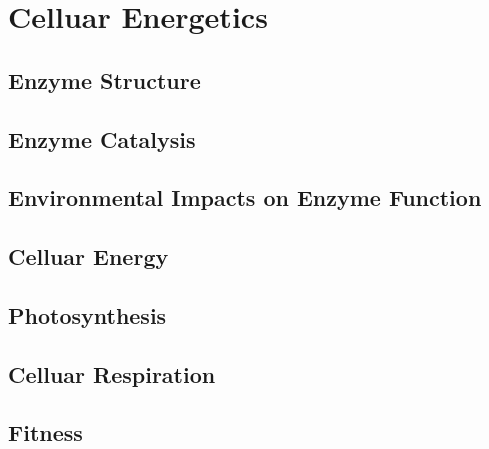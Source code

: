 \documentclass[../bio.tex]{subfiles}
\begin{document}
\chapter{Celluar Energetics}
\section{Enzyme Structure}
\section{Enzyme Catalysis}
\section{Environmental Impacts on Enzyme Function}
\section{Celluar Energy}
\section{Photosynthesis}
\section{Celluar Respiration}
\section{Fitness}
\end{document}
